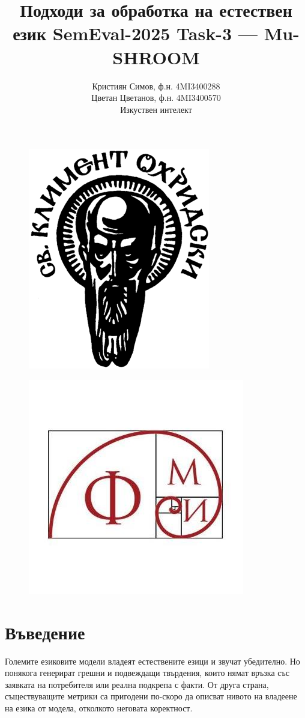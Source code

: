 \documentclass[12pt]{article}
\begin{document}
	
	\title{ Подходи за обработка на естествен език \newline SemEval-2025 Task-3 — Mu-SHROOM  \newline}
	
	
	\author{Кристиян Симов, ф.н. 4MI3400288 \\ Цветан Цветанов, ф.н. 4MI3400570 \\ Изкуствен интелект}
	\maketitle
	
		\begin{figure}[H]
			\centering
			\includegraphics[width=0.25\linewidth]{clement-ohrid-logo.png}
		\end{figure}
		
		\begin{figure}[H]
			\centering
			\includegraphics[width=0.25\linewidth]{fmi-logo.jpg}
		\end{figure}
	
	
	\vspace{0.5in}
	\pagebreak
	
	\section{Въведение}
	
	Големите езиковите модели владеят естествените езици и звучат убедително. Но понякога генерират грешни и подвеждащи твърдения,  които нямат връзка със заявката на потребителя  или реална подкрепа с факти.  От друга страна, съществуващите метрики са пригодени по-скоро да  описват  нивото на владеене на езика от модела, отколкото неговата коректност. \newline
	
\end{document}
